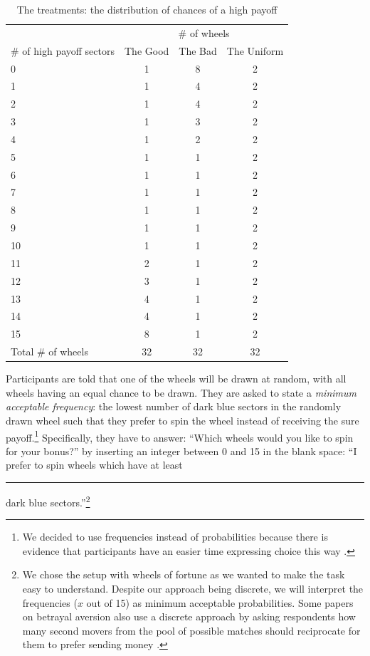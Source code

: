 \documentclass[pdftex,12pt, a4paper]{article}
\begin{document}
\begin{table}[htbp]
\centering \caption{The treatments: the distribution of chances of a high payoff}\label{tab:distr}
\begin{threeparttable}
\begin{tabular}
   {@{}
	l
	*3c
	@{}
	}
\toprule
	&	\multicolumn{3}{c}{\# of wheels}\\
	\cmidrule{2-4}
\# of high payoff sectors 	&	{The Good}&{The Bad}&	{The Uniform}\\
\cmidrule{2-4}
0	&	1&       8&	2\\
1	&	1&       4&	2\\
2	&	1&       4&	2\\
3	&	1&       3&	2\\
4	&	1&       2&	2\\
5	&	1&       1&	2\\
6	&	1&       1&	2\\
7	&	1&       1&	2\\
8	&	1&       1&	2\\
9	&	1&       1&	2\\
10	&	1&       1&	2\\
11	&	2&       1&	2\\
12	&	3&       1&	2\\
13	&	4&       1&	2\\
14	&	4&       1&	2\\
15	&	8&       1&	2\\
\midrule
Total \# of wheels	&	32&       32&	32\\
\bottomrule

\end{tabular}
\end{threeparttable}
\end{table}

Participants are told that one of the wheels will be drawn at random, with all wheels having an equal chance to be drawn.
They are asked to state a \textit{minimum acceptable frequency}: the lowest number of dark blue sectors in the randomly drawn wheel such that they prefer to spin the wheel instead of receiving the sure payoff.\footnote{
We decided to use frequencies instead of probabilities because there is evidence that participants have an easier time expressing choice this way \citep{Quercia2016}.}
Specifically, they have to answer: ``Which wheels would you like to spin for your bonus?'' by inserting an integer between 0 and 15 in the blank space: ``I prefer to spin wheels which have at least \rule{1cm}{0.15mm} dark blue sectors.''\footnote{
We chose the setup with wheels of fortune as we wanted to make the task easy to understand.
Despite our approach being discrete, we will interpret the frequencies ($x$ out of 15) as minimum acceptable probabilities.
Some papers on betrayal aversion also use a discrete approach by asking respondents how many second movers from the pool of possible matches should reciprocate for them to prefer sending money \citep[e.g. one of the experiments in][]{Quercia2016}.
}
\end{document}
